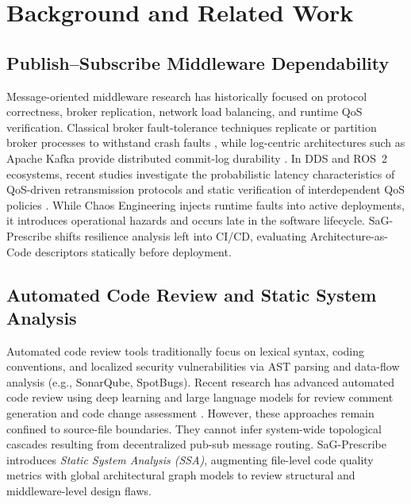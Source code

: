 \section{Background and Related Work}
\label{sec:related_work}

\subsection{Publish--Subscribe Middleware Dependability}
\label{sec:related:pubsub}

Message-oriented middleware research has historically focused on protocol correctness, broker replication, network load balancing, and runtime QoS verification. Classical broker fault-tolerance techniques replicate or partition broker processes to withstand crash faults \citep{pallickara2007fault, chang2014p2s}, while log-centric architectures such as Apache Kafka provide distributed commit-log durability \citep{wang2015building}. In DDS and ROS~2 ecosystems, recent studies investigate the probabilistic latency characteristics of QoS-driven retransmission protocols \citep{lee2025probabilistic} and static verification of interdependent QoS policies \citep{lee2025dependency}. While Chaos Engineering \citep{basiri2016chaos} injects runtime faults into active deployments, it introduces operational hazards and occurs late in the software lifecycle. SaG-Prescribe shifts resilience analysis left into CI/CD, evaluating Architecture-as-Code descriptors statically before deployment.

\subsection{Automated Code Review and Static System Analysis}
\label{sec:related:codereview}

Automated code review tools traditionally focus on lexical syntax, coding conventions, and localized security vulnerabilities via AST parsing and data-flow analysis (e.g., SonarQube, SpotBugs). Recent research has advanced automated code review using deep learning and large language models for review comment generation and code change assessment \citep{tufano2022towards, lu2021codexglue}. However, these approaches remain confined to source-file boundaries. They cannot infer system-wide topological cascades resulting from decentralized pub-sub message routing. SaG-Prescribe introduces \emph{Static System Analysis (SSA)}, augmenting file-level code quality metrics with global architectural graph models to review structural and middleware-level design flaws.

